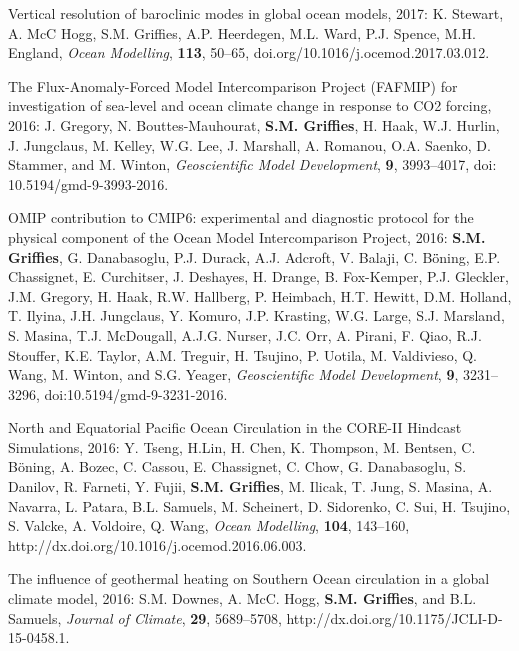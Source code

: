 \begin{etaremune}
\item Vertical resolution of baroclinic modes in global ocean models,
  2017: K. Stewart, A. McC Hogg, S.M. Grif\/f\/ies, A.P. Heerdegen,
  M.L. Ward, P.J. Spence, M.H. England,  {\it Ocean Modelling},
  {\bf 113}, 50--65, doi.org/10.1016/j.ocemod.2017.03.012.

\item The Flux-Anomaly-Forced Model Intercomparison Project (FAFMIP)
  for investigation of sea-level and ocean climate change in response
  to CO2 forcing, 2016: J. Gregory, N. Bouttes-Mauhourat, {\bf
    S.M. Grif\/f\/ies}, H. Haak, W.J. Hurlin, J.  Jungclaus,
  M. Kelley, W.G. Lee, J. Marshall, A. Romanou, O.A. Saenko,
  D. Stammer, and M.  Winton, {\it Geoscientific Model Development},
  {\bf 9}, 3993--4017, doi: 10.5194/gmd-9-3993-2016.







\item OMIP contribution to CMIP6: experimental and diagnostic protocol
  for the physical component of the Ocean Model Intercomparison
  Project, 2016: {\bf S.M. Grif\/f\/ies}, G. Danabasoglu, P.J. Durack,
  A.J. Adcroft, V. Balaji, C. B\"{o}̈ning, E.P. Chassignet,
  E. Curchitser, J. Deshayes, H. Drange, B. Fox-Kemper, P.J. Gleckler,
  J.M. Gregory, H. Haak, R.W. Hallberg, P. Heimbach, H.T. Hewitt,
  D.M. Holland, T. Ilyina, J.H. Jungclaus, Y. Komuro, J.P. Krasting,
  W.G. Large, S.J. Marsland, S. Masina, T.J. McDougall, A.J.G. Nurser,
  J.C. Orr, A. Pirani, F. Qiao, R.J. Stouffer, K.E. Taylor,
  A.M. Treguir, H. Tsujino, P. Uotila, M. Valdivieso, Q. Wang,
  M. Winton, and S.G. Yeager, {\it Geoscientific Model Development},
  {\bf 9}, 3231--3296, doi:10.5194/gmd-9-3231-2016.

\item North and Equatorial Pacific Ocean Circulation in the CORE-II
  Hindcast Simulations, 2016: Y. Tseng, H.Lin, H. Chen, K.  Thompson,
  M. Bentsen, C. B\"{o}ning, A. Bozec, C. Cassou, E.  Chassignet,
  C. Chow, G. Danabasoglu, S. Danilov, R. Farneti, Y. Fujii, {\bf
    S.M. Grif\/f\/ies}, M. Ilicak, T. Jung, S. Masina, A. Navarra,
  L. Patara, B.L.  Samuels, M. Scheinert, D. Sidorenko, C. Sui,
  H. Tsujino, S. Valcke, A. Voldoire, Q. Wang, {\it Ocean Modelling},
  {\bf 104}, 143--160, http://dx.doi.org/10.1016/j.ocemod.2016.06.003.

\item The influence of geothermal heating on Southern Ocean
  circulation in a global climate model, 2016: S.M. Downes,
  A. McC. Hogg, {\bf S.M. Grif\/f\/ies}, and B.L. Samuels, {\it
    Journal of Climate}, {\bf 29}, 5689--5708,
  http://dx.doi.org/10.1175/JCLI-D-15-0458.1.


\end{etaremune}
